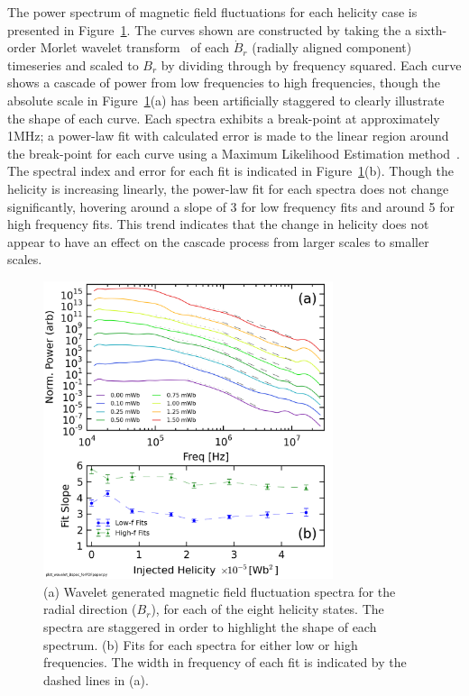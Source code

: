 \documentclass[aps,prl,amsmath,amssymb,reprint,superscriptaddress]{revtex4-1} %
\begin{document}
The power spectrum of magnetic field fluctuations for each helicity case is presented in Figure~\ref{fig:Br_spectra}. The curves shown are constructed by taking the a sixth-order Morlet wavelet transform~\cite{torrence98} of each $\dot{B}_{r}$ (radially aligned component) timeseries and scaled to $B_{r}$ by dividing through by frequency squared. Each curve shows a cascade of power from low frequencies to high frequencies, though the absolute scale in Figure~\ref{fig:Br_spectra}(a) has been artificially staggered to clearly illustrate the shape of each curve. Each spectra exhibits a break-point at approximately 1MHz; a power-law fit with calculated error is made to the linear region around the break-point for each curve using a Maximum Likelihood Estimation method~\cite{clauset09}. The spectral index and error for each fit is indicated in Figure~\ref{fig:Br_spectra}(b). Though the helicity is increasing linearly, the power-law fit for each spectra does not change significantly, hovering around a slope of 3 for low frequency fits and around 5 for high frequency fits. This trend indicates that the change in helicity does not appear to have an effect on the cascade process from larger scales to smaller scales. 

\begin{figure}[!htbp]
\centerline{
\includegraphics[width=8.5cm]{Br_spectra.png}}
\caption{\label{fig:Br_spectra} (a) Wavelet generated magnetic field fluctuation spectra for the radial direction ($B_{r}$), for each of the eight helicity states. The spectra are staggered in order to highlight the shape of each spectrum. (b) Fits for each spectra for either low or high frequencies. The width in frequency of each fit is indicated by the dashed lines in (a).}
\end{figure}
\end{document}
